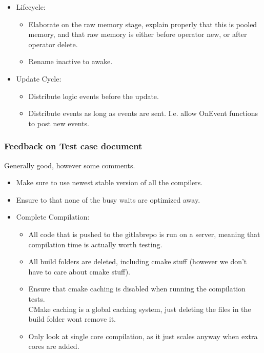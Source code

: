 \documentclass{article}
\begin{document}
\begin{itemize}
    \item
    Lifecycle:
    \begin{itemize}
        \item
        Elaborate on the raw memory stage, explain properly that this is pooled memory, and that raw memory is either before operator new, or after operator delete.

        \item
        Rename inactive to awake.
    \end{itemize}

    \item
    Update Cycle:
    \begin{itemize}
        \item
        Distribute logic events before the update.

        \item
        Distribute events as long as events are sent. I.e. allow OnEvent functions to post new events.
    \end{itemize}
\end{itemize}

\subsubsection*{Feedback on Test case document}
Generally good, however some comments.
\begin{itemize}
    \item
    Make sure to use newest stable version of all the compilers.

    \item
    Ensure to that none of the busy waits are optimized away.

    \item
    Complete Compilation:
    \begin{itemize}
        \item
        All code that is pushed to the gitlabrepo is run on a server, meaning that compilation time is actually worth testing.
        
        \item
        All build folders are deleted, including cmake stuff (however we don't have to care about cmake stuff).

        \item
        Ensure that cmake caching is disabled when running the compilation tests.\\
        CMake caching is a global caching system, just deleting the files in the build folder wont remove it.

        \item
        Only look at single core compilation, as it just scales anyway when extra cores are added.

    \end{itemize}
\end{itemize}
\end{document}
